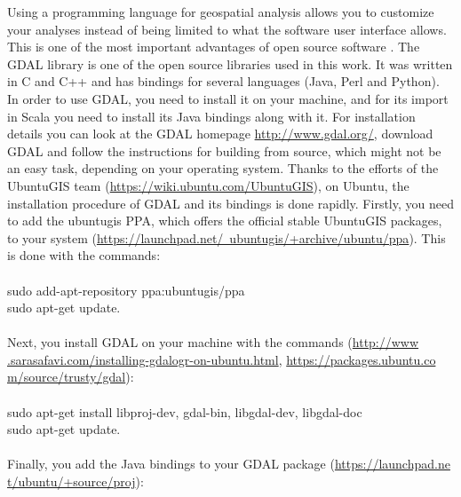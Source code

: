 \documentclass {article}
\begin{document}
Using a programming language for geospatial analysis allows you to customize your analyses instead of being limited to what the software user interface allows. This is one of the most important advantages of open source software \cite{garrard_geoprocessing_2016}. The GDAL library is one of the open source libraries used in this work. It was written in C and C++ and has bindings for several languages (Java, Perl and Python). \\     
In order to use GDAL, you need to install it on your machine, and for its import in Scala you need to install its Java bindings along with it.  
For installation details you can look at the GDAL homepage \href{http://www.gdal.org/}{http://www.gdal.org/}, download GDAL and follow the instructions for building from source, which might not be an easy task, depending on your operating system. 
Thanks to the efforts of the UbuntuGIS team (\href{https://wiki.ubuntu.com/UbuntuGIS}{https://wiki.ubuntu.com/UbuntuGIS}), on Ubuntu, the installation procedure of GDAL and its bindings is done rapidly. Firstly, you need to add the ubuntugis PPA, which offers the official stable UbuntuGIS packages, to your system (\href{https://launchpad.net/~ubuntugis/+archive/ubuntu/ppa}{https://launchpad.net/~ubuntugis/+archive/ubuntu/ppa}). This is done with the commands: \\
\\
sudo add-apt-repository ppa:ubuntugis/ppa \\
sudo apt-get update.\\
\\
Next, you install GDAL on your machine with the commands \cite{safavi_installing_2015} \cite{noauthor_ubuntugis_nodate} (\href{http://www.sarasafavi.com/installing-gdalogr-on-ubuntu.html}{http://www\\.sarasafavi.com/installing-gdalogr-on-ubuntu.html}, \href{https://packages.ubuntu.com/source/trusty/gdal}{https://packages.ubuntu.co\\m/source/trusty/gdal}):\\
\\
sudo apt-get install libproj-dev, gdal-bin, libgdal-dev, libgdal-doc \\
sudo apt-get update.\\
\\
Finally, you add the Java bindings to your GDAL package (\href{https://launchpad.net/ubuntu/+source/proj}{https://launchpad.ne\\ t/ubuntu/+source/proj}):\\
\\
\end{document}
